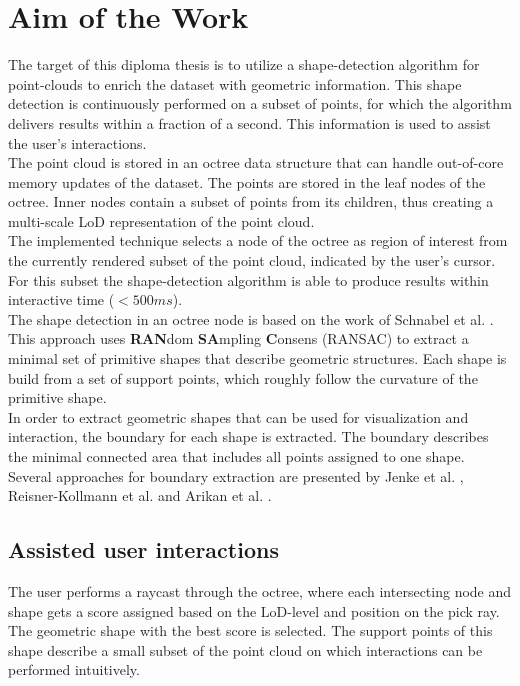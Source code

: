 \section{Aim of the Work}
\label{sec:aim}
The target of this diploma thesis is to utilize a shape-detection algorithm for point-clouds to enrich the dataset with geometric information. This shape detection is continuously performed on a subset of points, for which the algorithm delivers results within a fraction of a second. This information is used to assist the user's interactions.
\\
The point cloud is stored in an octree data structure that can handle out-of-core memory updates of the dataset. The points are stored in the leaf nodes of the octree. Inner nodes contain a subset of points from its children, thus creating a multi-scale LoD representation of the point cloud.
\\
The implemented technique selects a node of the octree as region of interest from the currently rendered subset of the point cloud, indicated by the user's cursor. For this subset the shape-detection algorithm is able to produce results within interactive time ($<500ms$).
\\
The shape detection in an octree node is based on the work of Schnabel et al. \cite{schnabel-2007-efficient}. This approach uses \textbf{RAN}dom \textbf{SA}mpling \textbf{C}onsens (RANSAC) \cite{fischler1981random} to extract a minimal set of primitive shapes that describe geometric structures. Each shape is build from a set of support points, which roughly follow the curvature of the primitive shape. 
\\
In order to extract geometric shapes that can be used for visualization and interaction, the boundary for each shape is extracted. The boundary describes the minimal connected area that includes all points assigned to one shape. Several approaches for boundary extraction are presented by Jenke et al. \cite{jenke2008surface},
Reisner-Kollmann et al. \cite{reisner2013reconstructing} and Arikan et al. \cite{arikan-2013-osn}.
\\
\subsection{Assisted user interactions}
The user performs a raycast through the octree, where each intersecting node and shape gets a score assigned based on the LoD-level and position on the pick ray. The geometric shape with the best score is selected. The support points of this shape describe a small subset of the point cloud on which interactions can be performed intuitively. 
\\
